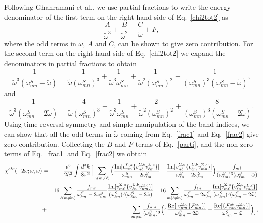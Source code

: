 \documentclass[floatfix,prb,aps,superscriptaddress,11pt]{revtex4}
\begin{document}
Following Ghahramani et al.,\cite{ghahramaniPRB91} we use
partial fractions to write the energy denominator of the first term on the
right hand side of Eq.~\eqref{chi2tot2} as 
\begin{equation}
\frac{A}{\tilde\omega^{3}}+\frac{B}{\tilde\omega^{2}}+\frac{C}{\tilde\omega}+F,  \label{parti}
\end{equation}
where the odd terms in $\omega$, $A$ and $C$, can be shown to give zero
contribution.\cite{ghahramaniPRB91} For the second term on the right hand
side of Eq.~\eqref{chi2tot2} we expand the denominators in partial fractions
to obtain 
\begin{equation}
\frac{1}{\tilde\omega^{3}(\omega_{mn}^{S}-\tilde\omega)}=\frac{1}{\tilde\omega(\omega_{mn}^{S})^{3}}+\frac{
1}{\tilde\omega^{3}\omega_{mn}^{S}}+\frac{1}{\tilde\omega^{2}(\omega_{mn}^{S})^{2}}+\frac{1}{(\omega
_{mn}^{S})^{3}(\omega_{mn}^{S}-\tilde\omega)},  \label{frac1}
\end{equation}
and 
\begin{equation}
\frac{1}{\tilde\omega^{3}(\omega_{mn}^{S}-2\tilde\omega)}=\frac{4}{\tilde\omega(\omega_{mn}^{S})^{3}}+
\frac{1}{\tilde\omega^{3}\omega_{mn}^{S}}+\frac{2}{\tilde\omega^{2}(\omega_{mn}^{S})^{2}}+\frac{8}{
(\omega_{mn}^{S})^{3}(\omega_{mn}^{S}-2\tilde\omega)}.  \label{frac2}
\end{equation}
Using time reversal symmetry and simple manipulation of the band indices, we
can show that all the odd terms in $\tilde\omega$ coming from Eq.~\eqref{frac1} and
Eq.~\eqref{frac2} give zero contribution. Collecting the $B$ and $F$ terms of
Eq.~\eqref{parti}, and the non-zero terms of Eq.~\eqref{frac1} and 
Eq.~\eqref{frac2} we obtain 
\begin{eqnarray}
\chi ^{abc}(-2\omega;\omega,\omega) &=&\frac{e^{3}}{2\hbar ^{2}}\int \frac{d^{3}k}{
8\pi ^{3}}\Big[\sum_{n(m\neq\ell)}\Big(\frac{\mbox{Im}\lbrack v_{mn}^{\Sigma
,a}\{v_{n\ell }^{\Sigma ,b}v_{\ell m}^{\Sigma ,c}\}]}{\omega_{nm}^{S}-2\omega
_{\ell m}^{S}}-\frac{\mbox{Im}\lbrack v_{n\ell }^{\Sigma ,a}\{v_{\ell
m}^{\Sigma ,b}v_{mn}^{\Sigma ,c}\}]}{\omega_{\ell n}^{S}-2\omega_{\ell m}^{S}}\Big)
\frac{f_{m\ell }}{(\omega_{\ell m}^{S})^{3}(\omega_{\ell m}^{S}-\tilde\omega)}  \notag
\label{chinn} \\
&-&16
\sum_{\ell(m\neq n)}
\frac{f_{mn}}{\omega_{\ell m}^{S}-2\omega_{nm}^{S}}
\frac{\mbox{Im}\lbrack v_{m\ell }^{\Sigma ,a}\{v_{\ell n}^{\Sigma,b}v_{nm}^{\Sigma ,c}\}]}
{(\omega_{\ell m}^{S})^{3}(\omega_{\ell m}^{S}-2\tilde\omega)}
-16
\sum_{m(\ell\neq n)}
\frac{f_{\ell n}}{\omega_{\ell m}^{S}-2\omega_{\ell n}^{S}}
\frac{\mbox{Im}\lbrack v_{m\ell }^{\Sigma ,a}\{v_{\ell n}^{\Sigma,b}v_{nm}^{\Sigma ,c}\}]}
{(\omega_{\ell m}^{S})^{3}(\omega_{\ell m}^{S}-2\tilde\omega)}  \notag \\
&+&\sum_{m\neq n}\frac{f_{nm}}{(\omega_{mn}^{S})^{3}}\Big(4\frac{\mbox{Re}\lbrack \
v_{nm}^{\Sigma ,a}\{\mathcal{F}_{mn}^{bc}\}]}{\omega_{mn}^{S}-2\tilde\omega}+\frac{
\mbox{Re}\lbrack \{\mathcal{F}_{nm}^{ab}v_{mn}^{\Sigma ,c}\}]}{\omega_{mn}^{S}-
\tilde\omega}\Big)\Big],
\end{eqnarray}
\end{document}
